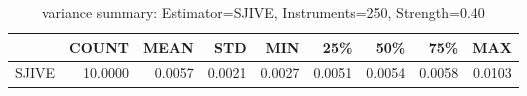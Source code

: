 \begin{table}[ht]
\centering
\caption{variance summary: Estimator=SJIVE, Instruments=250, Strength=0.40}
\begin{tabular}{lrrrrrrrr}
\toprule
 & COUNT & MEAN & STD & MIN & 25\% & 50\% & 75\% & MAX \\
\midrule
SJIVE & 10.0000 & 0.0057 & 0.0021 & 0.0027 & 0.0051 & 0.0054 & 0.0058 & 0.0103 \\
\bottomrule
\end{tabular}
\end{table}

